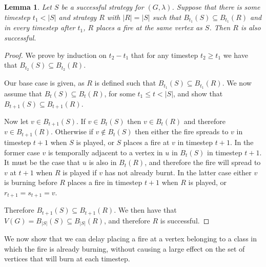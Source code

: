\documentclass[preprint,12pt]{elsarticle}
\newtheorem{lemma}{Lemma}
\begin{document}
\begin{lemma}
\label{lem:settimelin1}
Let $S$ be a successful strategy for $(G, \lambda)$. Suppose that there is some timestep $t_1 < |S|$ and strategy $R$ with $|R|=|S|$ such that $B_{t_1}(S) \subseteq B_{t_1}(R)$ and in every timestep after $t_1$, $R$ places a fire at the same vertex as $S$. Then $R$ is also successful.
\end{lemma}
\begin{proof}
We prove by induction on $t_2-t_1$ that for any timestep $t_2 \geq t_1$ we have that $B_{t_2}(S) \subseteq B_{t_2}(R)$.

Our base case is given, as $R$ is defined such that $B_{t_1}(S) \subseteq B_{t_1}(R)$. We now assume that $B_t(S) \subseteq B_t(R)$, for some $t_1 \leq t < |S|$, and show that $B_{t+1}(S) \subseteq B_{t+1}(R)$.

Now let $v \in B_{t+1}(S)$. If $v \in B_t(S)$ then $v \in B_t(R)$ and therefore $v \in B_{t+1}(R)$. Otherwise if $v \notin B_t(S)$ then either the fire spreads to $v$ in timestep $t+1$ when $S$ is played, or $S$ places a fire at $v$ in timestep $t+1$. In the former case $v$ is temporally adjacent to a vertex in $u$ in $B_t(S)$ in timestep $t+1$. It must be the case that $u$ is also in $B_t(R)$, and therefore the fire will spread to $v$ at $t+1$ when $R$ is played if $v$ has not already burnt. In the latter case either $v$ is burning before $R$ places a fire in timestep $t+1$ when $R$ is played, or $r_{t+1} = s_{t+1} = v$.

Therefore $B_{t+1}(S) \subseteq B_{t+1}(R)$. We then have that $V(G) = B_{|S|}(S) \subseteq B_{|S|}(R)$, and therefore $R$ is successful.
\end{proof}

We now show that we can delay placing a fire at a vertex belonging to a class in which the fire is already burning, without causing a large effect on the set of vertices that will burn at each timestep.
\end{document}
